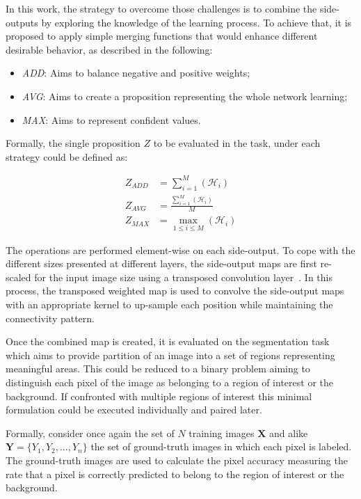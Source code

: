
In this work, the strategy to overcome those challenges is to combine the side-outputs by exploring the knowledge of the learning process. To achieve that, it is proposed to apply simple merging functions that would enhance different desirable behavior, as described in the following: 
\begin{itemize}
\item \textit{ADD}: Aims to balance negative and positive weights;
\item \textit{AVG}: Aims to create a proposition representing the whole network learning;  
\item \textit{MAX}: Aims to represent confident values. 
\end{itemize}  

Formally, the single proposition $Z$ to be evaluated in the task, under each strategy could be defined as:

\begin{align}
Z_{ADD} &= \sum_{i=1}^{M}(\mathcal{H}_i)\\
Z_{AVG} &= \frac{\sum_{i=1}^{M}(\mathcal{H}_i)}{M}\\
Z_{MAX} &= \max_{1 \leq i \leq M} (\mathcal{H}_i)
\end{align} 

The operations are performed element-wise on each side-output. To cope with the different sizes presented at different layers, the side-output maps are first re-scaled for the input image size using a transposed convolution layer~\cite{dumoulin2016}. In this process, the transposed weighted map is used to convolve the side-output maps with an appropriate kernel to up-sample each position while maintaining the connectivity pattern. 

Once the combined map is created, it is evaluated on the segmentation task which aims to provide partition of an image into a set of regions representing meaningful areas. This could be reduced to a binary problem aiming to distinguish each pixel of the image as belonging to a region of interest or the background. If confronted with multiple regions of interest this minimal formulation could be executed individually and paired later.

Formally, consider once again the set of $N$ training images $\mathbf{X}$ and alike $\mathbf{Y}=\{Y_1, Y_2,...,Y_n\}$ the set of ground-truth images in which each pixel is labeled.  The ground-truth images are used to calculate the pixel accuracy measuring the rate that a pixel is correctly predicted to belong to the region of interest or the background.

